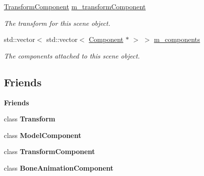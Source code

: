 \begin{Indent}
\begin{DoxyCompactItemize}
\mbox{\hyperlink{classrev_1_1_transform_component}{Transform\+Component}} \mbox{\hyperlink{classrev_1_1_scene_object_adae45070e8f54a3e74a2d0de1bf1dd9d}{m\+\_\+transform\+Component}}
\begin{DoxyCompactList}\small\item\em The transform for this scene object. \end{DoxyCompactList}\item 
std\+::vector$<$ std\+::vector$<$ \mbox{\hyperlink{classrev_1_1_component}{Component}} $\ast$ $>$ $>$ \mbox{\hyperlink{classrev_1_1_scene_object_aab3dd77506ac3ec6adcae61cbad58395}{m\+\_\+components}}
\begin{DoxyCompactList}\small\item\em The components attached to this scene object. \end{DoxyCompactList}\end{DoxyCompactItemize}
\end{Indent}
\subsection*{Friends}
\begin{Indent}\textbf{ Friends}\par
\begin{DoxyCompactItemize}
\item 
\mbox{\label{classrev_1_1_scene_object_af851b4d9aacd1a871da33592334b8d72}} 
class {\bfseries Transform}
\item 
\mbox{\label{classrev_1_1_scene_object_a746faefa2253090b747a03f2817d8a7c}} 
class {\bfseries Model\+Component}
\item 
\mbox{\label{classrev_1_1_scene_object_a0edcec9985d6a3f36e57ef258b49815c}} 
class {\bfseries Transform\+Component}
\item 
\mbox{\label{classrev_1_1_scene_object_a68369f3d806a081715c367d5ac0cbacc}} 
class {\bfseries Bone\+Animation\+Component}
\end{DoxyCompactItemize}
\end{Indent}

